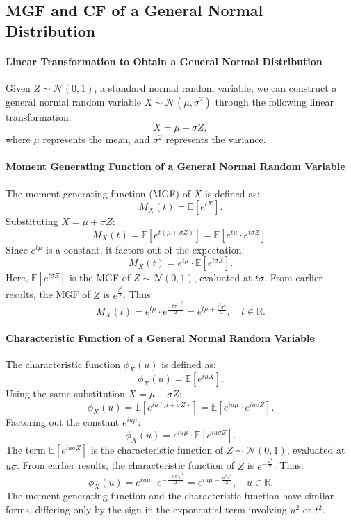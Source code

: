     \subsection{MGF and CF of a General Normal Distribution}
    
    \paragraph{Linear Transformation to Obtain a General Normal Distribution}
    Given \( Z \sim \mathcal{N}(0, 1) \), a standard normal random variable, we can construct a general normal random variable \( X \sim \mathcal{N}(\mu, \sigma^2) \) through the following linear transformation:
    \[
    X = \mu + \sigma Z,
    \]
    where \( \mu \) represents the mean, and \( \sigma^2 \) represents the variance.
    
    \paragraph{Moment Generating Function of a General Normal Random Variable}
    The moment generating function (MGF) of \( X \) is defined as:
    \[
    M_X(t) = \mathbb{E}[e^{tX}].
    \]
    Substituting \( X = \mu + \sigma Z \):
    \[
    M_X(t) = \mathbb{E}[e^{t(\mu + \sigma Z)}] = \mathbb{E}[e^{t\mu} \cdot e^{t\sigma Z}].
    \]
    Since \( e^{t\mu} \) is a constant, it factors out of the expectation:
    \[
    M_X(t) = e^{t\mu} \cdot \mathbb{E}[e^{t\sigma Z}].
    \]
    Here, \( \mathbb{E}[e^{t\sigma Z}] \) is the MGF of \( Z \sim \mathcal{N}(0, 1) \), evaluated at \( t\sigma \). From earlier results, the MGF of \( Z \) is \( e^{\frac{t^2}{2}} \). Thus:
    \[
    M_X(t) = e^{t\mu} \cdot e^{\frac{(t\sigma)^2}{2}} = e^{t\mu + \frac{t^2\sigma^2}{2}}, \quad t \in \mathbb{R}.
    \]
    
    \paragraph{Characteristic Function of a General Normal Random Variable}
    
    The characteristic function \( \phi_X(u) \) is defined as:
    \[
    \phi_X(u) = \mathbb{E}[e^{iuX}].
    \]
    Using the same substitution \( X = \mu + \sigma Z \):
    \[
    \phi_X(u) = \mathbb{E}[e^{iu(\mu + \sigma Z)}] = \mathbb{E}[e^{iu\mu} \cdot e^{iu\sigma Z}].
    \]
    Factoring out the constant \( e^{iu\mu} \):
    \[
    \phi_X(u) = e^{iu\mu} \cdot \mathbb{E}[e^{iu\sigma Z}].
    \]
    The term \( \mathbb{E}[e^{iu\sigma Z}] \) is the characteristic function of \( Z \sim \mathcal{N}(0, 1) \), evaluated at \( u\sigma \). From earlier results, the characteristic function of \( Z \) is \( e^{-\frac{u^2}{2}} \). Thus:
    \[
    \phi_X(u) = e^{iu\mu} \cdot e^{-\frac{(u\sigma)^2}{2}} = e^{iu\mu - \frac{u^2\sigma^2}{2}}, \quad u \in \mathbb{R}.
    \]
    The moment generating function and the characteristic function have similar forms, differing only by the sign in the exponential term involving \( u^2 \) or \( t^2 \).
    

